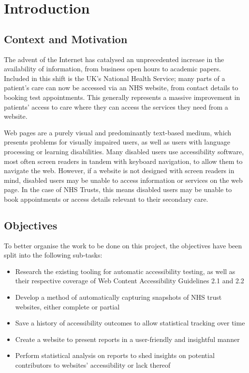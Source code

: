 \chapter{Introduction}\label{cha:intro}


\section{Context and Motivation}
The advent of the Internet has catalysed an unprecedented increase in the availability of information, from business open hours to academic papers. Included in this shift is the UK's National Health Service; many parts of a patient's care can now be accessed via an NHS website, from contact details to booking test appointments. This generally represents a massive improvement in patients' access to care where they can access the services they need from a website.

Web pages are a purely visual and predominantly text-based medium, which presents problems for visually impaired users, as well as users with language processing or learning disabilities. Many disabled users use accessibility software, most often screen readers in tandem with keyboard navigation, to allow them to navigate the web. However, if a website is not designed with screen readers in mind, disabled users may be unable to access information or services on the web page. In the case of NHS Trusts, this means disabled users may be unable to book appointments or access details relevant to their secondary care.

\section{Objectives}\label{sec: objectives}
To better organise the work to be done on this project, the objectives have been split into the following sub-tasks:
\begin{itemize}
    \item Research the existing tooling for automatic accessibility testing, as well as their respective coverage of Web Content Accessibility Guidelines 2.1 and 2.2
    \item Develop a method of automatically capturing snapshots of NHS trust websites, either complete or partial
    \item Save a history of accessibility outcomes to allow statistical tracking over time
    \item Create a website to present reports in a user-friendly and insightful manner
    \item Perform statistical analysis on reports to shed insights on potential contributors to websites' accessibility or lack thereof
\end{itemize}

